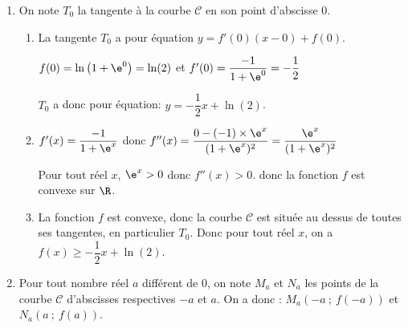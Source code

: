 \begin{enumerate}
\begin{enumerate}
\begin{center}
{\renewcommand{\arraystretch}{1.3}
\def\esp{\hspace*{4cm}}%
\def\hauteur{20pt}%
$\begin{array}{|c| *3{c}|}
\hline
 x & -\infty   & \esp & +\infty \\
 \hline
f'(x) &   & \pmb{-} & \\  
\hline
  &  \Rnode{max}{+\infty} &    &    \\
f(x) & &  &  \rule{0pt}{\hauteur} \\
 &      & & \Rnode{min}{0} \rule{0pt}{\hauteur}
\ncline{->}{max}{min}
\\
\hline
\end{array}$
}
\end{center}

	\end{enumerate}	
\item On note $T_0$ la tangente à la courbe $\mathcal{C}$ en son point d'abscisse $0$.
	\begin{enumerate}
		\item La tangente $T_0$ a pour équation $y=f'(0)\left (x-0\right )+f(0)$.		

$f(0) = \ln\left (1+\e^{0}\right )=\ln(2)$ et $f'(0) = \dfrac{-1}{1+\e^{0}} = -\dfrac{1}{2}$

$T_0$ a donc pour équation: $y=-\dfrac{1}{2}x + \ln(2)$.
		
		\item %
$f'(x)=\dfrac{-1}{1+\e^{x}}$ donc $f''(x)= \dfrac{0 - (-1)\times \e^{x}}{(1+\e^{x})^2}
= \dfrac{\e^{x}}{(1+\e^{x})^2}$

Pour tout réel $x$, $\e^{x}>0$ donc $f''(x)>0$. donc la fonction $f$ est convexe sur $\R$.		
				
		\item %
La fonction $f$ est convexe, donc  la courbe $\mathcal{C}$ est située au dessus de toutes ses tangentes, en particulier $T_0$.
Donc pour tout réel $x$, on a $f(x) \geqslant -\dfrac{1}{2} x + \ln(2)$.
		\end{enumerate}	
		
\item Pour tout nombre réel $a$ différent de 0, on note $M_a$ et $N_a$ les points de la courbe $\mathcal{C}$ d'abscisses respectives $-a$ et $a$. 
On a donc : $M_a\left(-a~;~ f(-a)\right)$ et $N_a\left(a~;~ f(a)\right)$.


\end{enumerate}
